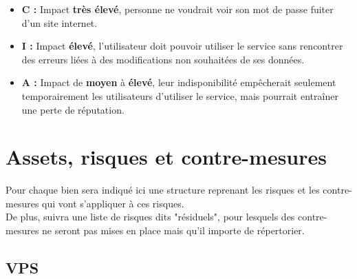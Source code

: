 \documentclass{report}
\begin{document}
			\begin{itemize}
				\item \textbf{C :} Impact \textbf{très élevé}, personne ne voudrait voir son mot de passe fuiter d'un site internet.\\
				\item \textbf{I :} Impact \textbf{élevé}, l'utilisateur doit pouvoir utiliser le service sans rencontrer des erreurs liées à des modifications non souhaitées de ses données.\\ 
				\item \textbf{A :} Impact de \textbf{moyen} à \textbf{élevé}, leur indisponibilité empêcherait seulement temporairement les utilisateurs d'utiliser le service, mais pourrait entraîner une perte de réputation.\\
			\end{itemize}

	\section{Assets, risques et contre-mesures}

		Pour chaque bien sera indiqué ici une structure reprenant les risques et les contre-mesures qui vont s'appliquer à ces risques.\\
		De plus, suivra une liste de risques dits "résiduels", pour lesquels des contre-mesures ne seront pas mises en place mais qu'il importe de répertorier.\\

		\subsection{VPS}
\end{document}
